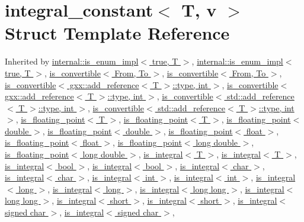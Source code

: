 \hypertarget{structintegral__constant}{}\section{integral\+\_\+constant$<$ T, v $>$ Struct Template Reference}
\label{structintegral__constant}


Inherited by \hyperlink{structinternal_1_1is__enum__impl_3_01true_00_01T_01_4}{internal\+::is\+\_\+enum\+\_\+impl$<$ true, T $>$}, \hyperlink{structinternal_1_1is__enum__impl_3_01true_00_01T_01_4}{internal\+::is\+\_\+enum\+\_\+impl$<$ true, T $>$}, \hyperlink{structis__convertible}{is\+\_\+convertible$<$ From, To $>$}, \hyperlink{structis__convertible}{is\+\_\+convertible$<$ From, To $>$}, \hyperlink{structis__convertible}{is\+\_\+convertible$<$ gxx\+::add\+\_\+reference$<$ T $>$\+::type, int $>$}, \hyperlink{structis__convertible}{is\+\_\+convertible$<$ gxx\+::add\+\_\+reference$<$ T $>$\+::type, int $>$}, \hyperlink{structis__convertible}{is\+\_\+convertible$<$ std\+::add\+\_\+reference$<$ T $>$\+::type, int $>$}, \hyperlink{structis__convertible}{is\+\_\+convertible$<$ std\+::add\+\_\+reference$<$ T $>$\+::type, int $>$}, \hyperlink{structis__floating__point}{is\+\_\+floating\+\_\+point$<$ T $>$}, \hyperlink{structis__floating__point}{is\+\_\+floating\+\_\+point$<$ T $>$}, \hyperlink{structis__floating__point_3_01double_01_4}{is\+\_\+floating\+\_\+point$<$ double $>$}, \hyperlink{structis__floating__point_3_01double_01_4}{is\+\_\+floating\+\_\+point$<$ double $>$}, \hyperlink{structis__floating__point_3_01float_01_4}{is\+\_\+floating\+\_\+point$<$ float $>$}, \hyperlink{structis__floating__point_3_01float_01_4}{is\+\_\+floating\+\_\+point$<$ float $>$}, \hyperlink{structis__floating__point_3_01long_01double_01_4}{is\+\_\+floating\+\_\+point$<$ long double $>$}, \hyperlink{structis__floating__point_3_01long_01double_01_4}{is\+\_\+floating\+\_\+point$<$ long double $>$}, \hyperlink{structis__integral}{is\+\_\+integral$<$ T $>$}, \hyperlink{structis__integral}{is\+\_\+integral$<$ T $>$}, \hyperlink{structis__integral_3_01bool_01_4}{is\+\_\+integral$<$ bool $>$}, \hyperlink{structis__integral_3_01bool_01_4}{is\+\_\+integral$<$ bool $>$}, \hyperlink{structis__integral_3_01char_01_4}{is\+\_\+integral$<$ char $>$}, \hyperlink{structis__integral_3_01char_01_4}{is\+\_\+integral$<$ char $>$}, \hyperlink{structis__integral_3_01int_01_4}{is\+\_\+integral$<$ int $>$}, \hyperlink{structis__integral_3_01int_01_4}{is\+\_\+integral$<$ int $>$}, \hyperlink{structis__integral_3_01long_01_4}{is\+\_\+integral$<$ long $>$}, \hyperlink{structis__integral_3_01long_01_4}{is\+\_\+integral$<$ long $>$}, \hyperlink{structis__integral_3_01long_01long_01_4}{is\+\_\+integral$<$ long long $>$}, \hyperlink{structis__integral_3_01long_01long_01_4}{is\+\_\+integral$<$ long long $>$}, \hyperlink{structis__integral_3_01short_01_4}{is\+\_\+integral$<$ short $>$}, \hyperlink{structis__integral_3_01short_01_4}{is\+\_\+integral$<$ short $>$}, \hyperlink{structis__integral_3_01signed_01char_01_4}{is\+\_\+integral$<$ signed char $>$}, \hyperlink{structis__integral_3_01signed_01char_01_4}{is\+\_\+integral$<$ signed char $>$}, 